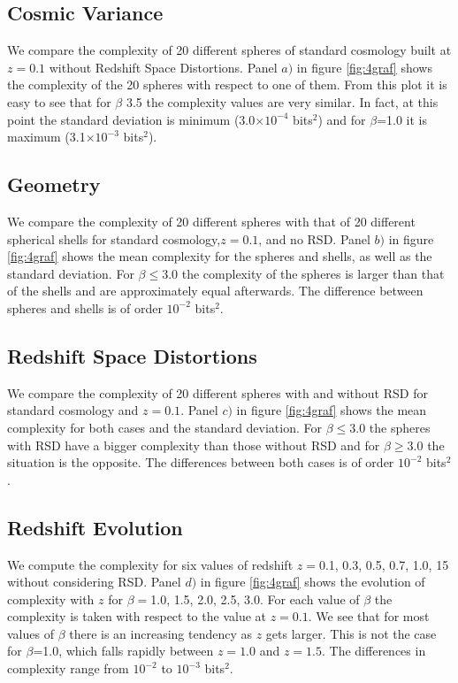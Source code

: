 \documentclass[fleqn,usenatbib]{mnras}
\begin{document}
\subsection{Cosmic Variance}

We compare the complexity of 20 different spheres of standard
cosmology built at $z=0.1$ without Redshift Space Distortions. Panel
$a)$ in figure \ref{fig:4graf} shows the complexity of the 20 spheres
with respect to one of them. From this plot it is easy to see that for
$\beta$ 3.5 the complexity values are very similar. In fact, at this
point the standard deviation is minimum (3.0$\times10^{-4}$
bits$^{2}$) and for $\beta$=1.0 it is maximum (3.1$\times10^{-3}$
bits$^{2}$).  



\subsection{Geometry}

We compare the complexity of 20 different spheres with that of 20
different spherical shells for standard cosmology,$z=0.1$, and no
RSD. Panel $b)$ in figure \ref{fig:4graf} shows the mean complexity
for the spheres and shells, as well as the standard deviation. For
$\beta\leq3.0$ the complexity of the spheres is larger than that of
the shells and are approximately equal afterwards. The difference
between spheres and shells is of order $10^{-2}$ bits$^{2}$. 




\subsection{Redshift Space Distortions}

We compare the complexity of 20 different spheres with and without RSD
for standard cosmology and $z=0.1$. Panel $c)$ in figure
\ref{fig:4graf} shows the mean complexity for both cases and the
standard deviation. For $\beta\leq3.0$ the spheres with RSD have a
bigger complexity than those without RSD and for $\beta\geq3.0$ the
situation is the opposite. The differences between both cases is of
order $10^{-2}$ bits$^2$. 


\subsection{Redshift Evolution}
We compute the complexity for six values of redshift $z=$0.1, 0.3,
0.5, 0.7, 1.0, 15 without considering RSD. Panel $d)$ in figure
\ref{fig:4graf} shows the evolution of complexity with $z$ for
$\beta=$1.0, 1.5, 2.0, 2.5, 3.0. For each value of $\beta$ the
complexity is taken with respect to the value at $z=0.1$. We see that
for most values of $\beta$ there is an increasing tendency as $z$ gets
larger. This is not the case for $\beta$=1.0, which falls rapidly
between $z=1.0$ and $z=1.5$. The differences in complexity range from
$10^{-2}$ to $10^{-3}$ bits$^2$. 
\end{document}

